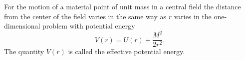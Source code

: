 For the motion of a material point of unit mass in a central field the distance from the center of the field varies in the same way as $r$ varies in the one-dimensional problem with potential energy
$$V(r) = U(r) + \frac{M^2}{2r^2}.$$
The quantity $V(r)$ is called the effective potential energy.
